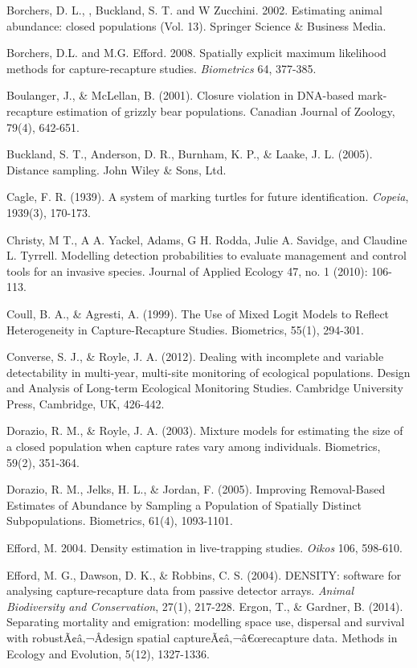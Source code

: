 \documentclass{book}
\begin{document}
\rf Borchers, D. L., , Buckland, S. T.  and W Zucchini. 2002. Estimating animal abundance: closed populations (Vol. 13). Springer Science \& Business Media.

\rf Borchers, D.L. and M.G. Efford. 2008. Spatially explicit maximum likelihood methods for capture-recapture studies. {\it Biometrics} 64, 377-385.

\rf Boulanger, J., \& McLellan, B. (2001). Closure violation in DNA-based mark-recapture estimation of grizzly bear populations. Canadian Journal of Zoology, 79(4), 642-651.

\rf Buckland, S. T., Anderson, D. R., Burnham, K. P., \& Laake, J. L. (2005). Distance sampling. John Wiley \& Sons, Ltd.

Cagle, F. R. (1939). A system of marking turtles for future identification. \textit{Copeia}, 1939(3), 170-173.

\rf Christy, M T., A A. Yackel, Adams, G H. Rodda, Julie A. Savidge, and Claudine L. Tyrrell. Modelling detection probabilities to evaluate management and control tools for an invasive species. Journal of Applied Ecology 47, no. 1 (2010): 106-113.

\rf Coull, B. A., \& Agresti, A. (1999). The Use of Mixed Logit Models to Reflect Heterogeneity in Capture-Recapture Studies. Biometrics, 55(1), 294-301.

\rf Converse, S. J., \& Royle, J. A. (2012). Dealing with incomplete and variable detectability in multi-year, multi-site monitoring of ecological populations. Design and Analysis of Long-term Ecological Monitoring Studies. Cambridge University Press, Cambridge, UK, 426-442.

\rf Dorazio, R. M., \& Royle, J. A. (2003). Mixture models for estimating the size of a closed population when capture rates vary among individuals. Biometrics, 59(2), 351-364.

\rf Dorazio, R. M., Jelks, H. L., \& Jordan, F. (2005). Improving Removal-Based Estimates of Abundance by Sampling a Population of Spatially Distinct Subpopulations. Biometrics, 61(4), 1093-1101.

\rf Efford, M. 2004. Density estimation in live-trapping studies. {\it Oikos}  106, 598-610.

\rf Efford, M. G., Dawson, D. K., \& Robbins, C. S. (2004). DENSITY: software for analysing capture-recapture data from passive detector arrays. \textit{Animal Biodiversity and Conservation}, 27(1), 217-228.
\rf Ergon, T., \& Gardner, B. (2014). Separating mortality and emigration: modelling space use, dispersal and survival with robustÃ¢â‚¬Âdesign spatial captureÃ¢â‚¬â€œrecapture data. Methods in Ecology and Evolution, 5(12), 1327-1336.
\end{document}

